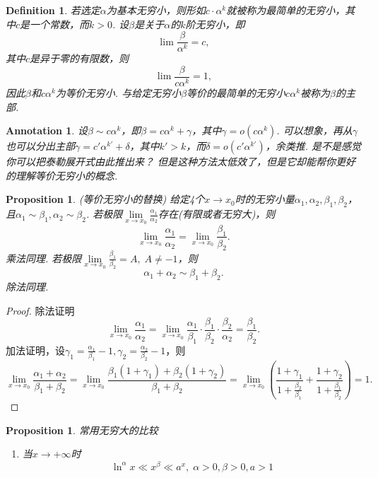 \documentclass{article}
\newtheorem{proposition}[theorem]{Proposition}
\newtheorem{definition}[theorem]{Definition}
\newtheorem{annotation}[theorem]{Annotation}
\begin{document}
\begin{definition}
\rm 若选定$\alpha$为基本无穷小，则形如$c\cdot \alpha^k$就被称为{\color{red}最简单的无穷小}，其中$c$是一个常数，而$k > 0$. 设$\beta$是关于$\alpha$的$k$阶无穷小，即
$$
\lim \frac{\beta}{\alpha^k} = c,
$$
其中$c$是异于零的有限数，则
$$
\lim \frac{\beta}{c\alpha^k} = 1,
$$
因此$\beta$和$c\alpha^k$为等价无穷小. 与给定无穷小$\beta$等价的最简单的无穷小$c\alpha^k$被称为$\beta$的{\color{red}主部}.
\end{definition}

\begin{annotation}
\rm 设$\beta \sim c\alpha^k$，即$\beta = c\alpha^k + \gamma$，其中$\gamma = o(c\alpha^k)$. 可以想象，再从$\gamma$也可以分出主部$\gamma = c'\alpha^{k'} + \delta$，其中$k' > k$，而$\delta = o(c'\alpha^{k'})$，余类推. {\color{blue}是不是感觉你可以把泰勒展开式由此推出来？ 但是这种方法太低效了，但是它却能帮你更好的理解等价无穷小的概念}.
\end{annotation}

\begin{proposition}
\rm {\color{red} (等价无穷小的替换) }给定4个$x \rightarrow x_0$时的无穷小量$\alpha_1,\alpha_2,\beta_1,\beta_2$，且$\alpha_1 \sim \beta_1, \alpha_2 \sim \beta_2$. 若极限$\lim\limits_{x \rightarrow x_0} \frac{\alpha_1}{\alpha_2}$存在(有限或者无穷大)，则
$$
\lim\limits_{x \rightarrow x_0} \frac{\alpha_1}{\alpha_2} = \lim\limits_{x \rightarrow x_0} \frac{\beta_1}{\beta_2}.
$$
乘法同理. 若极限$\lim\limits_{x \rightarrow x_0} \frac{\beta_1}{\beta_2} = A, \; A \neq -1$，则
$$
\alpha_1 + \alpha_2 \sim \beta_1 + \beta_2.
$$ 
除法同理.
\end{proposition}

\begin{proof}
除法证明
$$
\lim\limits_{x \rightarrow x_0} \frac{\alpha_1}{\alpha_2}= \lim\limits_{x \rightarrow x_0} \frac{\alpha_1}{\beta_1} \cdot \frac{\beta_1}{\beta_2} \cdot \frac{\beta_2}{\alpha_2} = \frac{\beta_1}{\beta_2}. 
$$
加法证明，设$\gamma_1 = \frac{\alpha_1}{\beta_1} - 1,\gamma_2 = \frac{\alpha_2}{\beta_2} - 1$，则
$$
\lim\limits_{x \rightarrow x_0} \frac{\alpha_1+\alpha_2}{\beta_1 + \beta_2} = \lim\limits_{x \rightarrow x_0} \frac{\beta_1(1+\gamma_1) + \beta_2(1+\gamma_2)}{\beta_1 + \beta_2} = \lim\limits_{x \rightarrow x_0} \left( \frac{1+\gamma_1}{1+\frac{\beta_2}{\beta_1}} + \frac{1+\gamma_2}{1+\frac{\beta_1}{\beta_2}} \right) = 1. 
$$
\end{proof}

\begin{proposition}
\rm  {\color{red} 常用无穷大的比较}
\begin{enumerate}
	\item 当$x \rightarrow +\infty$时
	$$
		\ln^\alpha x \ll x^\beta \ll a^x, \;\alpha > 0 ,\beta > 0,a > 1 
	$$
\end{enumerate}
\end{proposition}
\end{document}
